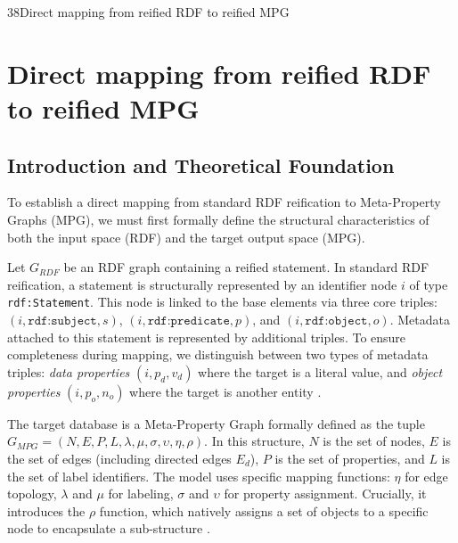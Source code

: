 
\begin{question}{3}{8}{Direct mapping from reified RDF to reified MPG}

\section{Direct mapping from reified RDF to reified MPG}
\subsection{Introduction and Theoretical Foundation}

To establish a direct mapping from standard RDF reification to Meta-Property Graphs (MPG), we must first formally define the structural characteristics of both the input space (RDF) and the target output space (MPG).

 Let $G_{RDF}$ be an RDF graph containing a reified statement. In standard RDF reification, a statement is structurally represented by an identifier node $i$ of type \texttt{rdf:Statement}. This node is linked to the base elements via three core triples: $(i, \texttt{rdf:subject}, s)$, $(i, \texttt{rdf:predicate}, p)$, and $(i, \texttt{rdf:object}, o)$. Metadata attached to this statement is represented by additional triples. To ensure completeness during mapping, we distinguish between two types of metadata triples: \textit{data properties} $(i, p_d, v_d)$ where the target is a literal value, and \textit{object properties} $(i, p_o, n_o)$ where the target is another entity \cite{hernandez_reifying_nodate, noauthor_rdf_nodate, hogan_knowledge_2022}.

 The target database is a Meta-Property Graph formally defined as the tuple $G_{MPG} = (N, E, P, L, \lambda, \mu, \sigma, \upsilon, \eta, \rho)$. In this structure, $N$ is the set of nodes, $E$ is the set of edges (including directed edges $E_d$), $P$ is the set of properties, and $L$ is the set of label identifiers. The model uses specific mapping functions: $\eta$ for edge topology, $\lambda$ and $\mu$ for labeling, $\sigma$ and $\upsilon$ for property assignment. Crucially, it introduces the $\rho$ function, which natively assigns a set of objects to a specific node to encapsulate a sub-structure \cite{sadoughi_meta-property_2025}.


\end{question}
